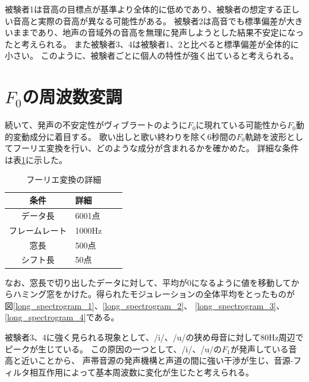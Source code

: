 \documentclass[10.5ptj,a4j,dvipdfmx,uplatex, oneside, openany]{jsbook}%
\begin{document}
被験者1は音高の目標点が基準より全体的に低めであり、被験者の想定する正しい音高と実際の音高が異なる可能性がある。
被験者2は高音でも標準偏差が大きいままであり、地声の音域外の音高を無理に発声しようとした結果不安定になったと考えられる。
また被験者3、4は被験者1、2と比べると標準偏差が全体的に小さい。
このように、被験者ごとに個人の特性が強く出ていると考えられる。



\section{$F_0$の周波数変調}
続いて、発声の不安定性がヴィブラートのように$F_0$に現れている可能性から$F_0$動的変動成分に着目する。
歌い出しと歌い終わりを除く6秒間の$F_0$軌跡を波形としてフーリエ変換を行い、どのような成分が含まれるかを確かめた。
詳細な条件は表\ref{table:F0Moduration}に示した。


\begin{table}[h]
    \caption{フーリエ変換の詳細}
    \label{table:F0Moduration}
    \centering
    \begin{tabular}{clll}
        \hline
        条件 & 詳細\\
        \hline \hline
        データ長 & 6001点\\
        フレームレート & 1000Hz\\
        窓長 & 500点\\
        シフト長 & 50点\\
        \hline
    \end{tabular}
\end{table}


なお、窓長で切り出したデータに対して、平均が0になるように値を移動してからハミング窓をかけた。得られたモジュレーションの全体平均をとったものが
図\ref{long_spectrogram_1}、\ref{long_spectrogram_2}、
\ref{long_spectrogram_3}、\ref{long_spectrogram_4}である。



被験者3、4に強く見られる現象として、/i/、/u/の狭め母音に対して80Hz周辺でピークが生じている。
この原因の一つとして、/i/、/u/の$F_1$が発声している音高と近いことから、
声帯音源の発声機構と声道の間に強い干渉が生じ、音源-フィルタ相互作用によって基本周波数に変化が生じたと考えられる。\cite{source-filterCoupling}
\end{document}
